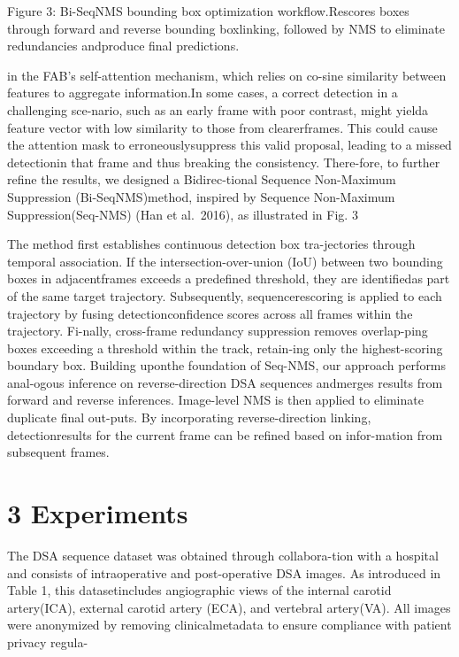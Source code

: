 \documentclass[
  10
]{article}
\begin{document}
Figure 3: Bi-SeqNMS bounding box optimization workflow.Rescores boxes
through forward and reverse bounding boxlinking, followed by NMS to
eliminate redundancies andproduce final predictions.

in the FAB's self-attention mechanism, which relies on co-sine
similarity between features to aggregate information.In some cases, a
correct detection in a challenging sce-nario, such as an early frame
with poor contrast, might yielda feature vector with low similarity to
those from clearerframes. This could cause the attention mask to
erroneouslysuppress this valid proposal, leading to a missed detectionin
that frame and thus breaking the consistency. There-fore, to further
refine the results, we designed a Bidirec-tional Sequence Non-Maximum
Suppression (Bi-SeqNMS)method, inspired by Sequence Non-Maximum
Suppression(Seq-NMS) (Han et al.~2016), as illustrated in Fig. 3

The method first establishes continuous detection box tra-jectories
through temporal association. If the intersection-over-union (IoU)
between two bounding boxes in adjacentframes exceeds a predefined
threshold, they are identifiedas part of the same target trajectory.
Subsequently, sequencerescoring is applied to each trajectory by fusing
detectionconfidence scores across all frames within the trajectory.
Fi-nally, cross-frame redundancy suppression removes overlap-ping boxes
exceeding a threshold within the track, retain-ing only the
highest-scoring boundary box. Building uponthe foundation of Seq-NMS,
our approach performs anal-ogous inference on reverse-direction DSA
sequences andmerges results from forward and reverse inferences.
Image-level NMS is then applied to eliminate duplicate final out-puts.
By incorporating reverse-direction linking, detectionresults for the
current frame can be refined based on infor-mation from subsequent
frames.

\section{3 Experiments}\label{experiments}

The DSA sequence dataset was obtained through collabora-tion with a
hospital and consists of intraoperative and post-operative DSA images.
As introduced in Table 1, this datasetincludes angiographic views of the
internal carotid artery(ICA), external carotid artery (ECA), and
vertebral artery(VA). All images were anonymized by removing
clinicalmetadata to ensure compliance with patient privacy regula-
\end{document}
